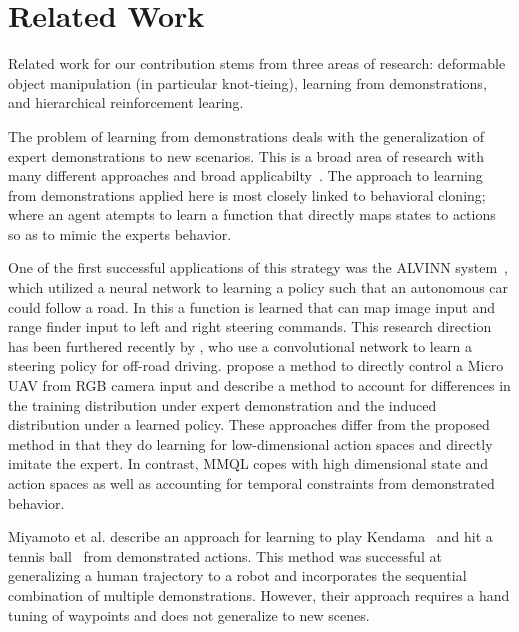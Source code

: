 \section{Related Work}
Related work for our contribution stems from three areas of research: deformable object manipulation (in particular knot-tieing), learning from demonstrations, and hierarchical reinforcement learing.


The problem of learning from demonstrations deals with the generalization of expert demonstrations to new scenarios. 
This is a broad area of research with many different approaches and broad applicabilty~\cite{Argall_2009, Schaal_1999}.
The approach to learning from demonstrations applied here is most closely linked to behavioral cloning; where an agent atempts to learn a function that directly maps states to actions so as to mimic the experts behavior. 

One of the first successful applications of this strategy was the ALVINN system~\cite{Pomerleau_NIPS1989}, which utilized a neural network to learning a policy such that an autonomous car could follow a road.
In this a function is learned that can map image input and range finder input to left and right steering commands. 
This research direction has been furthered recently by \citet{muller2005off}, who use a convolutional network to learn a steering policy for off-road driving.
\citet{Ross_2013} propose a method to directly control a Micro UAV from RGB camera input and describe a method to account for differences in the training distribution under expert demonstration and the induced distribution under a learned policy. 
These approaches differ from the proposed method in that they do learning for low-dimensional action spaces and directly imitate the expert.
In contrast, MMQL copes with high dimensional state and action spaces as well as accounting for temporal constraints from demonstrated behavior.

Miyamoto et al. describe an approach for learning to play Kendama~\cite{Miyamoto_1996} and hit a tennis ball~\cite{Miyamoto_1998} from demonstrated actions. 
This method was successful at generalizing a human trajectory to a robot and incorporates the sequential combination of multiple demonstrations.
However, their approach requires a hand tuning of waypoints and does not generalize to new scenes.


